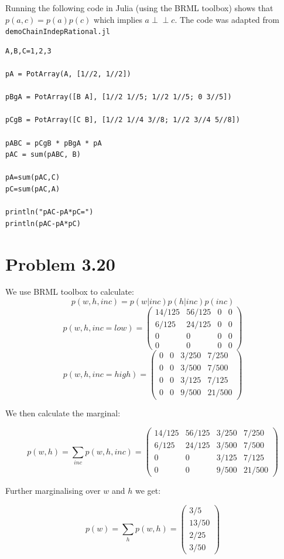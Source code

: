 \documentclass[11pt,a4paper,oneside]{report}
\newcommand\ci{\perp\!\!\!\perp} %
\begin{document}
Running the following code in Julia (using the BRML toolbox) shows that $p(a,c) 
= p(a)p(c)$ which implies $a \ci c$. The code was adapted from 
\texttt{demoChainIndepRational.jl}

\begin{lstlisting}
A,B,C=1,2,3

pA = PotArray(A, [1//2, 1//2])

pBgA = PotArray([B A], [1//2 1//5; 1//2 1//5; 0 3//5])

pCgB = PotArray([C B], [1//2 1//4 3//8; 1//2 3//4 5//8])

pABC = pCgB * pBgA * pA
pAC = sum(pABC, B)

pA=sum(pAC,C)
pC=sum(pAC,A)

println("pAC-pA*pC=")
println(pAC-pA*pC)

\end{lstlisting}


\section*{Problem 3.20}

We use BRML toolbox to calculate:
$$p(w,h,inc) = p(w|inc)p(h|inc)p(inc)$$
$$p(w,h,inc = low) = 
\begin{pmatrix}
 14/125 & 56/125 & 0 & 0\\
  6/125 & 24/125 & 0 & 0\\
  0   &  0   & 0 & 0\\
  0   &  0   & 0 & 0
\end{pmatrix}
$$
$$p(w,h,inc = high) = 
\begin{pmatrix}
 0 & 0 & 3/250 &  7/250\\
 0 & 0 & 3/500 &  7/500\\
 0 & 0 & 3/125 &  7/125\\
 0 & 0 & 9/500 & 21/500
\end{pmatrix}
$$

We then calculate the marginal:

$$p(w,h) = \sum_{inc}p(w,h,inc) = 
\begin{pmatrix}
 14/125 & 56/125 & 3/250 &  7/250\\
  6/125 & 24/125 & 3/500 &  7/500\\
  0    & 0   & 3/125 &  7/125\\
  0    & 0   & 9/500 & 21/500
\end{pmatrix}
$$

Further marginalising over $w$ and $h$ we get:

$$p(w) = \sum_{h}p(w,h) = 
\begin{pmatrix}
  3/5\\
  13/50\\
  2/25\\
  3/50
\end{pmatrix}
$$
\end{document}
